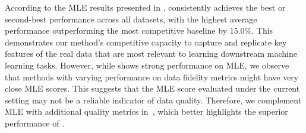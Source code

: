 According to the MLE results presented in , \method consistently achieves the best or second-best performance across all datasets, with the highest average performance outperforming the most competitive baseline \tabsyn by $15.0\%$. This demonstrates our method's competitive capacity to capture and replicate key features of the real data that are most relevant to learning downstream machine learning tasks. However, while \method shows strong performance on MLE, we observe that methods with varying performance on data fidelity metrics might have very close MLE scores. This suggests that the MLE score evaluated under the current setting may not be a reliable indicator of data quality. Therefore, we complement MLE with additional quality metrics in~, which better highlights the superior performance of \method.

